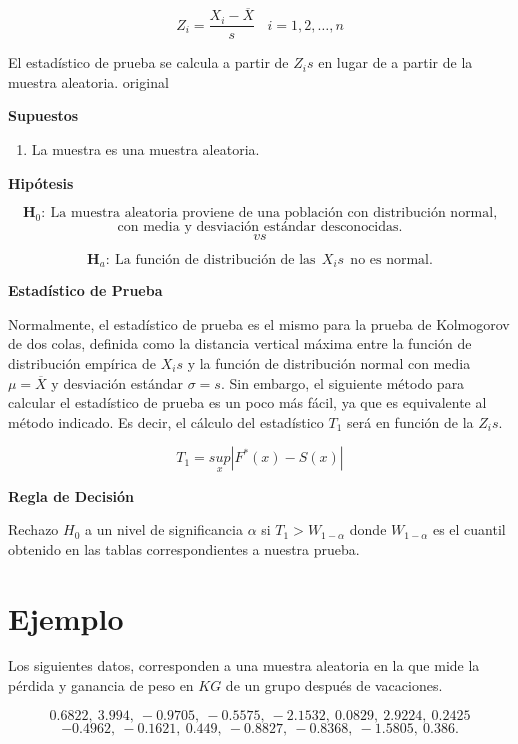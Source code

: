 \documentclass[
  a4paper,
  oneside,
  openany]{book}
\providecommand{\tightlist}{%
  \setlength{\itemsep}{0pt}\setlength{\parskip}{0pt}}
\begin{document}
\[Z_{i}=\frac{X_{i}-\overline{X}}{s} \ \ \ \ i=1,2,\ldots,n\]

El estadístico de prueba se calcula a partir de \(Z_{i}s\) en lugar de a partir de la muestra aleatoria. original

\textbf{Supuestos}

\begin{enumerate}
\def\labelenumi{\arabic{enumi})}
\tightlist
\item
  La muestra es una muestra aleatoria.
\end{enumerate}

\textbf{Hipótesis}

\[\textbf{H}_0: \ \mbox{La muestra aleatoria proviene de una población con distribución normal,}\]
\[\mbox{con media y desviación estándar desconocidas.}\]
\[vs\]

\[\textbf{H}_a: \ \mbox{La función de distribución de las} \ \ X_{i}s \ \  \mbox{no es normal.}\]

\textbf{Estadístico de Prueba}

Normalmente, el estadístico de prueba es el mismo para la prueba de Kolmogorov de dos colas, definida como la distancia vertical máxima entre la función de distribución empírica de \(X_{i}s\) y la función de distribución normal con media \(\mu=\overline{X}\) y desviación estándar \(\sigma=s\).
Sin embargo, el siguiente método para calcular el estadístico de prueba es un poco más fácil, ya que es equivalente al método indicado. Es decir, el cálculo del estadístico \(T_{1}\) será en función de la \(Z_{i}s\).

\[T_{1}=\underset{x}{sup}|F^*(x)-S(x)|\]

\textbf{Regla de Decisión}

Rechazo \(H_0\) a un nivel de significancia \(\alpha\) si \(T_{1}> W_{1-\alpha}\) donde \(W_{1-\alpha}\) es el cuantil obtenido en las tablas correspondientes a nuestra prueba.

\hypertarget{ejemplo-13}{%
\section{Ejemplo}\label{ejemplo-13}}

Los siguientes datos, corresponden a una muestra aleatoria en la que mide la pérdida y ganancia de peso en \(KG\) de un grupo después de vacaciones.

\[0.6822,\ 3.994,\ -0.9705,\ -0.5575,\ -2.1532,\ 0.0829,\ 2.9224,\ 0.2425\]
\[-0.4962,\ -0.1621,\ 0.449,\ -0.8827,\ -0.8368,\ -1.5805,\ 0.386.\]
\end{document}
